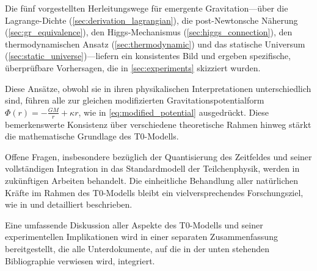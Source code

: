 \documentclass[12pt,a4paper]{article}
\begin{document}
	Die fünf vorgestellten Herleitungswege für emergente Gravitation—über die Lagrange-Dichte (\cref{sec:derivation_lagrangian}), die post-Newtonsche Näherung (\cref{sec:gr_equivalence}), den Higgs-Mechanismus (\cref{sec:higgs_connection}), den thermodynamischen Ansatz (\cref{sec:thermodynamic}) und das statische Universum (\cref{sec:static_universe})—liefern ein konsistentes Bild und ergeben spezifische, überprüfbare Vorhersagen, die in \cref{sec:experiments} skizziert wurden.
	
	Diese Ansätze, obwohl sie in ihren physikalischen Interpretationen unterschiedlich sind, führen alle zur gleichen modifizierten Gravitationspotentialform \(\Phi(r) = -\frac{GM}{r} + \kappa r\), wie in \cref{eq:modified_potential} ausgedrückt. Diese bemerkenswerte Konsistenz über verschiedene theoretische Rahmen hinweg stärkt die mathematische Grundlage des T0-Modells.
	
	Offene Fragen, insbesondere bezüglich der Quantisierung des Zeitfeldes und seiner vollständigen Integration in das Standardmodell der Teilchenphysik, werden in zukünftigen Arbeiten behandelt. Die einheitliche Behandlung aller natürlichen Kräfte im Rahmen des T0-Modells bleibt ein vielversprechendes Forschungsziel, wie in \cite{pascher_lagrange_2025} und \cite{pascher_higgs_2025} detailliert beschrieben.
	
	Eine umfassende Diskussion aller Aspekte des T0-Modells und seiner experimentellen Implikationen wird in einer separaten Zusammenfassung bereitgestellt, die alle Unterdokumente, auf die in der unten stehenden Bibliographie verwiesen wird, integriert.
	
\end{document}

